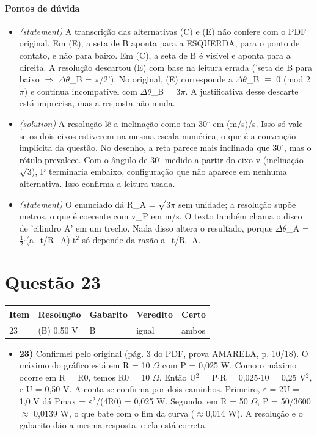\documentclass{article}%
\begin{document}
\paragraph{Pontos de dúvida}%
\begin{itemize}%
\item%
\textit{(statement)} A transcrição das alternativas (C) e (E) não confere com o PDF original. Em (E), a seta de B aponta para a ESQUERDA, para o ponto de contato, e não para baixo. Em (C), a seta de B é visível e aponta para a direita. A resolução descartou (E) com base na leitura errada ('seta de B para baixo $\Rightarrow$ $\Delta$$\theta$\_B = $\pi$/2'). No original, (E) corresponde a $\Delta$$\theta$\_B $\equiv$ 0 (mod 2$\pi$) e continua incompatível com $\Delta$$\theta$\_B = 3$\pi$. A justificativa desse descarte está imprecisa, mas a resposta não muda.%
\item%
\textit{(solution)} A resolução lê a inclinação como tan 30$^\circ$ em (m/s)/s. Isso só vale se os dois eixos estiverem na mesma escala numérica, o que é a convenção implícita da questão. No desenho, a reta parece mais inclinada que 30$^\circ$, mas o rótulo prevalece. Com o ângulo de 30$^\circ$ medido a partir do eixo v (inclinação $\surd$3), P terminaria embaixo, configuração que não aparece em nenhuma alternativa. Isso confirma a leitura usada.%
\item%
\textit{(statement)} O enunciado dá R\_A = $\surd$3$\pi$ sem unidade; a resolução supõe metros, o que é coerente com v\_P em m/s. O texto também chama o disco de 'cilindro A' em um trecho. Nada disso altera o resultado, porque $\Delta$$\theta$\_A = $\frac12$$\cdot$(a\_t/R\_A)$\cdot$t$^2$ só depende da razão a\_t/R\_A.%
\end{itemize}%
\section*{Questão 23}%
\begin{longtable}{@{}p{} p{} p{} p{} p{}@{}}\toprule Item & Resolução & Gabarito & Veredito & Certo \\ \midrule
23 & (B) 0,50 V & B & igual & ambos \\
\bottomrule\end{longtable}%
\begin{itemize}%
\item%
\textbf{23)} Confirmei pelo original (pág. 3 do PDF, prova AMARELA, p. 10/18). O máximo do gráfico está em R = 10 $\Omega$ com P = 0,025 W. Como o máximo ocorre em R = R0, temos R0 = 10 $\Omega$. Então U$^2$ = P$\cdot$R = 0,025$\cdot$10 = 0,25 V$^2$, e U = 0,50 V. A conta se confirma por dois caminhos. Primeiro, $\varepsilon$ = 2U = 1,0 V dá Pmax = $\varepsilon$$^2$/(4R0) = 0,025 W. Segundo, em R = 50 $\Omega$, P = 50/3600 $\approx$ 0,0139 W, o que bate com o fim da curva ($\approx$0,014 W). A resolução e o gabarito dão a mesma resposta, e ela está correta.%
\end{itemize}%
\end{document}
